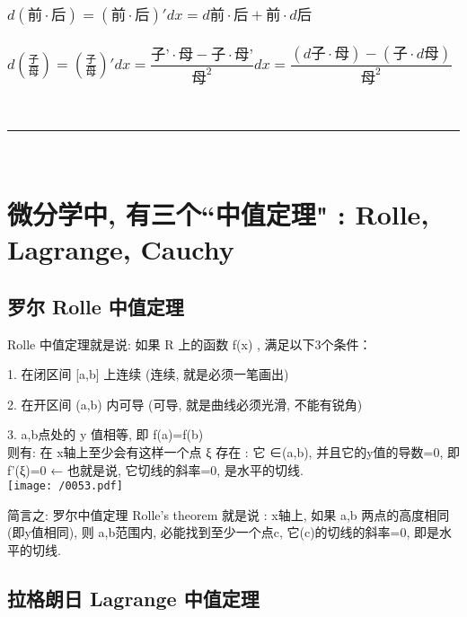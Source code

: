 \documentclass[UTF8]{ctexart}
\begin{document}
	\subsubsection{$d\left( \text{前}\cdot \text{后} \right) =\left( \text{前}\cdot \text{后} \right) 'dx=d\text{前}\cdot \text{后}+\text{前}\cdot d\text{后}	$}
	
	\subsubsection{$d\left( \frac{\text{子}}{\text{母}} \right) =\left( \frac{\text{子}}{\text{母}} \right) 'dx=\dfrac{\text{子'}\cdot \text{母}-\text{子}\cdot \text{母'}}{\text{母}^2}dx=\dfrac{\left( d\text{子}\cdot \text{母} \right) -\left( \text{子}\cdot d\text{母} \right)}{\text{母}^2}	$}


	
	
~\\
\hrule
~\\	
	
	
	
\section{微分学中, 有三个``中值定理" : Rolle, Lagrange, Cauchy}	
	
	
	\subsection{罗尔 Rolle 中值定理}		
	
	Rolle 中值定理就是说:  如果 R 上的函数 f(x) , 满足以下3个条件：
	
	1. 在闭区间 [a,b] 上连续 (连续, 就是必须一笔画出) 
	
	2. 在开区间 (a,b) 内可导 (可导, 就是曲线必须光滑, 不能有锐角) 
	
	3. a,b点处的 y 值相等, 即 f(a)=f(b) \\
	
	则有: 在 x轴上至少会有这样一个点 ξ 存在 : 它 ∈(a,b), 并且它的y值的导数=0, 即 f'(ξ)=0 ← 也就是说, 它切线的斜率=0, 是水平的切线. \\
	
	\texttt{[image: /0053.pdf]}
	
	简言之: 罗尔中值定理 Rolle's theorem 就是说 :  x轴上, 如果 a,b 两点的高度相同(即y值相同), 则 a,b范围内, 必能找到至少一个点c, 它(c)的切线的斜率=0, 即是水平的切线.
	
	
	
	\subsection{拉格朗日 Lagrange 中值定理}	
	
\end{document}
